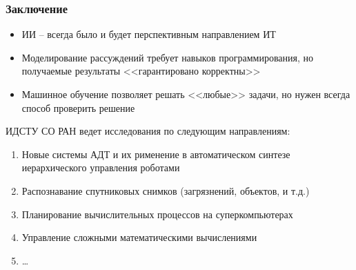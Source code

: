 \documentclass[10pt]{beamer}
\begin{document}
\begin{frame}
  \frametitle{Заключение}
  \begin{itemize}
  \item ИИ -- всегда было и будет перспективным направлением ИТ
  \item Моделирование рассуждений требует навыков программирования, но получаемые результаты <<гарантировано корректны>>
  \item Машинное обучение позволяет решать <<любые>> задачи, но нужен всегда способ проверить решение
  \end{itemize}
  ИДСТУ СО РАН ведет исследования по следующим направлениям:
  \begin{enumerate}
  \item Новые системы АДТ и их рименение в автоматическом синтезе иерархического управления роботами
  \item Распознавание спутниковых снимков (загрязнений, объектов, и т.д.)
  \item Планирование вычислительных процессов на суперкомпьютерах
  \item Управление сложными математическими вычислениями
  \item \ldots
  \end{enumerate}
\end{frame}
\end{document}
